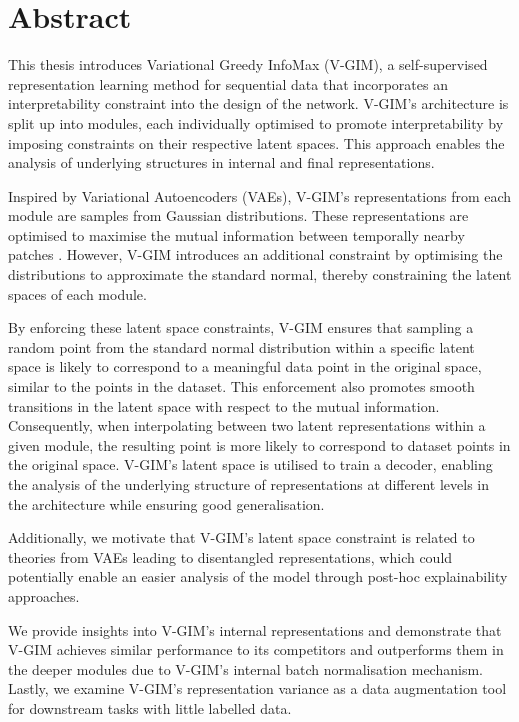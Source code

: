 \chapter*{ Abstract}

This thesis introduces Variational Greedy InfoMax (V-GIM), a self-supervised representation learning method for sequential data that incorporates an interpretability constraint into the design of the network. V-GIM's architecture is split up into modules, each individually optimised to promote interpretability by imposing constraints on their respective latent spaces. This approach enables the analysis of underlying structures in internal and final representations.

Inspired by Variational Autoencoders (VAEs), V-GIM's representations from each module are samples from Gaussian distributions. These representations are optimised to maximise the mutual information between temporally nearby patches \cite{lowePuttingEndEndtoEnd2020a}. However, V-GIM introduces an additional constraint by optimising the distributions to approximate the standard normal, thereby constraining the latent spaces of each module.


By enforcing these latent space constraints, V-GIM ensures that sampling a random point from the standard normal distribution within a specific latent space is likely to correspond to a meaningful data point in the original space, similar to the points in the dataset. This enforcement also promotes smooth transitions in the latent space with respect to the mutual information. Consequently, when interpolating between two latent representations within a given module, the resulting point is more likely to correspond to dataset points in the original space. V-GIM's latent space is utilised to train a decoder, enabling the analysis of the underlying structure of representations at different levels in the architecture while ensuring good generalisation.

Additionally, we motivate that V-GIM's latent space constraint is related to theories from VAEs leading to disentangled representations, which could potentially enable an easier analysis of the model through post-hoc explainability approaches. 

We provide insights into V-GIM's internal representations and demonstrate that V-GIM achieves similar performance to its competitors and outperforms them in the deeper modules due to V-GIM's internal batch normalisation mechanism. Lastly, we examine V-GIM's representation variance as a data augmentation tool for downstream tasks with little labelled data.




